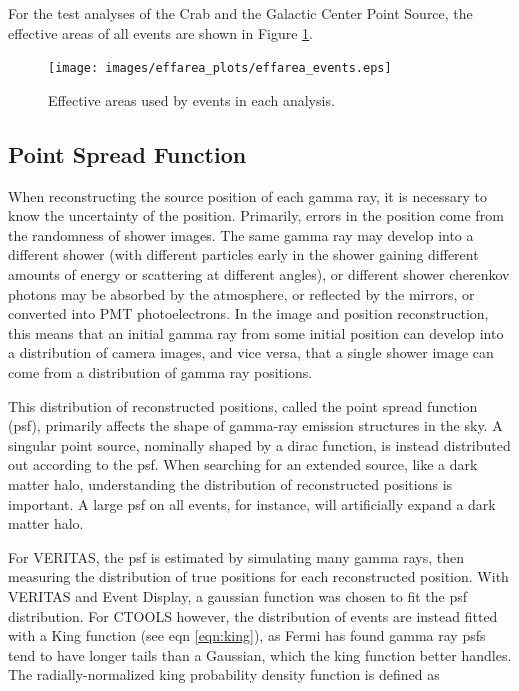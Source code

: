     For the test analyses of the Crab and the Galactic Center Point Source, the effective areas of all events are shown in Figure \ref{fig:effarea_usage}.

    \begin{figure}[ht]
      \centering
      \texttt{[image: images/effarea\_plots/effarea\_events.eps]}
      \caption[Effective Areas Used]
      {Effective areas used by events in each analysis.}
      \label{fig:effarea_usage}
    \end{figure}

    \subsection{Point Spread Function}\label{subsec:psf}

    When reconstructing the source position of each gamma ray, it is necessary to know the uncertainty of the position.
    Primarily, errors in the position come from the randomness of shower images.
    The same gamma ray may develop into a different shower (with different particles early in the shower gaining different amounts of energy or scattering at different angles), or different shower cherenkov photons may be absorbed by the atmosphere, or reflected by the mirrors, or converted into PMT photoelectrons.
    In the image and position reconstruction, this means that an initial gamma ray from some initial position can develop into a distribution of camera images, and vice versa, that a single shower image can come from a distribution of gamma ray positions.

    This distribution of reconstructed positions, called the point spread function (psf), primarily affects the shape of gamma-ray emission structures in the sky.
    A singular point source, nominally shaped by a dirac function, is instead distributed out according to the psf.
    When searching for an extended source, like a dark matter halo, understanding the distribution of reconstructed positions is important.
    A large psf on all events, for instance, will artificially expand a dark matter halo.

    For VERITAS, the psf is estimated by simulating many gamma rays, then measuring the distribution of true positions for each reconstructed position.
    With VERITAS and Event Display, a gaussian function was chosen to fit the psf distribution.
    For CTOOLS however, the distribution of events are instead fitted with a King function \cite{king1962} (see eqn \ref{eqn:king}), as Fermi \cite{fermipsf} has found gamma ray psfs tend to have longer tails than a Gaussian, which the king function better handles.
    The radially-normalized king probability density function is defined as

